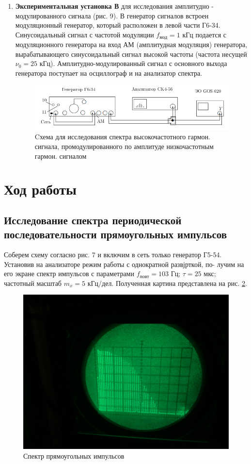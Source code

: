 \documentclass[12pt]{kiarticle}
\begin{document}
\begin{enumerate}
		\item \textbf{Экспериментальная установка В} для исследования амплитудно - модулированного сигнала (рис. 9). В генератор сигналов встроен модуляционный генератор, который расположен в левой части Г6-34. Синусоидальный сигнал с частотой модуляции $f_{мод}=1$ кГц подается с модуляционного генератора на вход АМ (амплитудная модуляция) генератора, вырабатывающего синусоидальный сигнал высокой частоты (частота несущей $\nu_{0}=25$ кГц). Амплитудно-модулированный сигнал с основного выхода генератора поступает на осциллограф и на анализатор спектра. 
		
		\begin{figure}[h]
			\centering
			\includegraphics[width=0.8\linewidth]{sp9.png}
			\caption{Cхема для исследования спектра высокочастотного гармон. сигнала, промодулированного по амплитуде низкочастотным гармон. сигналом}
			\label{C}
		\end{figure}
	\end{enumerate}

  	\section{Ход работы}
  	
  	\subsection{Исследование спектра периодической последовательности прямоугольных импульсов}
  	
  	Соберем схему согласно рис. 7 и включим в сеть только генератор Г5-54.
 	Установив на анализаторе режим работы с однократной развјрткой, по-
  	лучим на его экране спектр импульсов с параметрами $ f_{повт}  = 103 $ Гц;
  $ \tau= 25 $ мкс; частотный масштаб $ m_x = 5 $ кГц/дел. Полученная картина представлена на рис. \ref{A_or}. 
  
  \begin{figure}[h]
  	\centering
  	\includegraphics[width=0.65\linewidth]{A_or.jpg}
  	\caption{Спектр прямоугольных импульсов}
  	\label{A_or}
  \end{figure}
  
\end{document}
